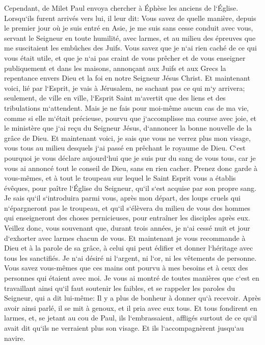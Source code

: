 \verse Cependant, de Milet Paul envoya chercher à Éphèse les anciens de l`Église. 
\verse Lorsqu`ils furent arrivés vers lui, il leur dit: Vous savez de quelle manière, depuis le premier jour où je suis entré en Asie, je me suis sans cesse conduit avec vous, 
\verse servant le Seigneur en toute humilité, avec larmes, et au milieu des épreuves que me suscitaient les embûches des Juifs. 
\verse Vous savez que je n`ai rien caché de ce qui vous était utile, et que je n`ai pas craint de vous prêcher et de vous enseigner publiquement et dans les maisons, 
\verse annonçant aux Juifs et aux Grecs la repentance envers Dieu et la foi en notre Seigneur Jésus Christ. 
\verse Et maintenant voici, lié par l`Esprit, je vais à Jérusalem, ne sachant pas ce qui m`y arrivera; 
\verse seulement, de ville en ville, l`Esprit Saint m`avertit que des liens et des tribulations m`attendent. 
\verse Mais je ne fais pour moi-même aucun cas de ma vie, comme si elle m`était précieuse, pourvu que j`accomplisse ma course avec joie, et le ministère que j`ai reçu du Seigneur Jésus, d`annoncer la bonne nouvelle de la grâce de Dieu. 
\verse Et maintenant voici, je sais que vous ne verrez plus mon visage, vous tous au milieu desquels j`ai passé en prêchant le royaume de Dieu. 
\verse C`est pourquoi je vous déclare aujourd`hui que je suis pur du sang de vous tous, 
\verse car je vous ai annoncé tout le conseil de Dieu, sans en rien cacher. 
\verse Prenez donc garde à vous-mêmes, et à tout le troupeau sur lequel le Saint Esprit vous a établis évêques, pour paître l`Église du Seigneur, qu`il s`est acquise par son propre sang. 
\verse Je sais qu`il s`introduira parmi vous, après mon départ, des loups cruels qui n`épargneront pas le troupeau, 
\verse et qu`il s`élèvera du milieu de vous des hommes qui enseigneront des choses pernicieuses, pour entraîner les disciples après eux. 
\verse Veillez donc, vous souvenant que, durant trois années, je n`ai cessé nuit et jour d`exhorter avec larmes chacun de vous. 
\verse Et maintenant je vous recommande à Dieu et à la parole de sa grâce, à celui qui peut édifier et donner l`héritage avec tous les sanctifiés. 
\verse Je n`ai désiré ni l`argent, ni l`or, ni les vêtements de personne. 
\verse Vous savez vous-mêmes que ces mains ont pourvu à mes besoins et à ceux des personnes qui étaient avec moi. 
\verse Je vous ai montré de toutes manières que c`est en travaillant ainsi qu`il faut soutenir les faibles, et se rappeler les paroles du Seigneur, qui a dit lui-même: Il y a plus de bonheur à donner qu`à recevoir. 
\verse Après avoir ainsi parlé, il se mit à genoux, et il pria avec eux tous. 
\verse Et tous fondirent en larmes, et, se jetant au cou de Paul, 
\verse ils l`embrassaient, affligés surtout de ce qu`il avait dit qu`ils ne verraient plus son visage. Et ils l`accompagnèrent jusqu`au navire. 

